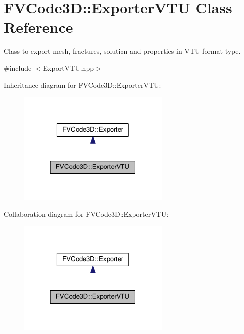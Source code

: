 \hypertarget{classFVCode3D_1_1ExporterVTU}{}\section{F\+V\+Code3D\+:\+:Exporter\+V\+TU Class Reference}
\label{classFVCode3D_1_1ExporterVTU}


Class to export mesh, fractures, solution and properties in V\+TU format type.  




{\ttfamily \#include $<$Export\+V\+T\+U.\+hpp$>$}



Inheritance diagram for F\+V\+Code3D\+:\+:Exporter\+V\+TU\+:
\nopagebreak
\begin{figure}[H]
\begin{center}
\leavevmode
\includegraphics[width=208pt]{classFVCode3D_1_1ExporterVTU__inherit__graph}
\end{center}
\end{figure}


Collaboration diagram for F\+V\+Code3D\+:\+:Exporter\+V\+TU\+:
\nopagebreak
\begin{figure}[H]
\begin{center}
\leavevmode
\includegraphics[width=208pt]{classFVCode3D_1_1ExporterVTU__coll__graph}
\end{center}
\end{figure}
